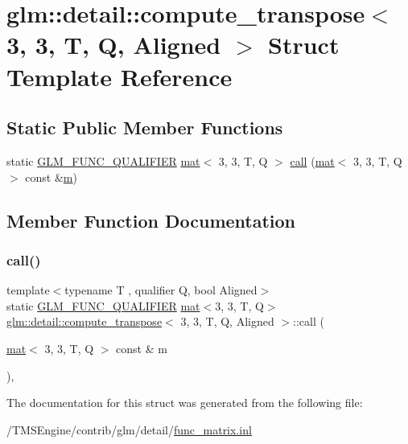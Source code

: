\hypertarget{structglm_1_1detail_1_1compute__transpose_3_013_00_013_00_01_t_00_01_q_00_01_aligned_01_4}{}\section{glm\+:\+:detail\+:\+:compute\+\_\+transpose$<$ 3, 3, T, Q, Aligned $>$ Struct Template Reference}
\label{structglm_1_1detail_1_1compute__transpose_3_013_00_013_00_01_t_00_01_q_00_01_aligned_01_4}
\subsection*{Static Public Member Functions}
\begin{DoxyCompactItemize}
\item 
static \hyperlink{setup_8hpp_a33fdea6f91c5f834105f7415e2a64407}{G\+L\+M\+\_\+\+F\+U\+N\+C\+\_\+\+Q\+U\+A\+L\+I\+F\+I\+ER} \hyperlink{structglm_1_1mat}{mat}$<$ 3, 3, T, Q $>$ \hyperlink{structglm_1_1detail_1_1compute__transpose_3_013_00_013_00_01_t_00_01_q_00_01_aligned_01_4_a4eec6b706e425647b7e49b24312a7e8f}{call} (\hyperlink{structglm_1_1mat}{mat}$<$ 3, 3, T, Q $>$ const \&\hyperlink{_s_d_l__opengl__glext_8h_af593500c283bf1a787a6f947f503a5c2}{m})
\end{DoxyCompactItemize}


\subsection{Member Function Documentation}
\mbox{\label{structglm_1_1detail_1_1compute__transpose_3_013_00_013_00_01_t_00_01_q_00_01_aligned_01_4_a4eec6b706e425647b7e49b24312a7e8f}} 
\subsubsection{\texorpdfstring{call()}{call()}}
{\footnotesize\ttfamily template$<$typename T , qualifier Q, bool Aligned$>$ \\
static \hyperlink{setup_8hpp_a33fdea6f91c5f834105f7415e2a64407}{G\+L\+M\+\_\+\+F\+U\+N\+C\+\_\+\+Q\+U\+A\+L\+I\+F\+I\+ER} \hyperlink{structglm_1_1mat}{mat}$<$3, 3, T, Q$>$ \hyperlink{structglm_1_1detail_1_1compute__transpose}{glm\+::detail\+::compute\+\_\+transpose}$<$ 3, 3, T, Q, Aligned $>$\+::call (\begin{DoxyParamCaption}\item[{\hyperlink{structglm_1_1mat}{mat}$<$ 3, 3, T, Q $>$ const \&}]{m }\end{DoxyParamCaption})\hspace{0.3cm}{\ttfamily [inline]}, {\ttfamily [static]}}



The documentation for this struct was generated from the following file\+:\begin{DoxyCompactItemize}
\item 
/\+T\+M\+S\+Engine/contrib/glm/detail/\hyperlink{func__matrix_8inl}{func\+\_\+matrix.\+inl}\end{DoxyCompactItemize}
